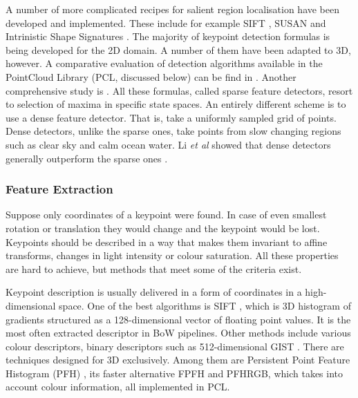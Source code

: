 		A number of more complicated recipes for salient region localisation have been developed and implemented. These include for example SIFT \cite{sift_keypoint}, SUSAN \cite{susan_keypoint} and Intrinistic Shape Signatures \cite{iss_keypoint}. The majority of keypoint detection formulas is being developed for the 2D domain. A number of them have been adapted to 3D, however. A comparative evaluation of detection algorithms available in the PointCloud Library (PCL, discussed below) can be find in \cite{pcl_keypoint_comparision}. Another comprehensive study is \cite{3d_keypoint_eval}. All these formulas, called sparse feature detectors, resort to selection of maxima in specific state spaces. An entirely different scheme is to use a dense feature detector. That is, take a uniformly sampled grid of points. Dense detectors, unlike the sparse ones, take points from slow changing regions such as clear sky and calm ocean water. Li \emph{et al} showed that dense detectors generally outperform the sparse ones \cite{fei2005bayesian}.
		
		\subsubsection{Feature Extraction}
		Suppose only coordinates of a keypoint were found. In case of even smallest rotation or translation they would change and the keypoint would be lost. Keypoints should be described in a way that makes them invariant to affine transforms, changes in light intensity or colour saturation. All these properties are hard to achieve, but methods that meet some of the criteria exist.
		
		Keypoint description is usually delivered in a form of coordinates in a high-dimensional space. One of the best algorithms is SIFT \cite{sift_features}, which is 3D histogram of gradients structured as a 128-dimensional vector of floating point values. It is the most often extracted descriptor in BoW pipelines. Other methods include various colour descriptors, binary descriptors such as 512-dimensional GIST \cite{ponce2011cv}. There are techniques designed for 3D exclusively. Among them are Persistent Point Feature Histogram (PFH) \cite{pfh_rusu2008}, its faster alternative FPFH \cite{fpfh_rusu2009} and PFHRGB, which takes into account colour information, all implemented in PCL.
		
